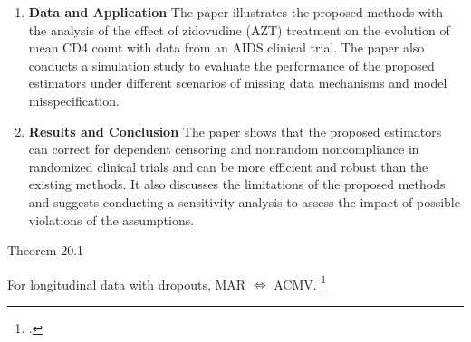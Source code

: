 \documentclass[UTF8,a4paper,10pt]{article}
\begin{document}
\begin{enumerate}
        \begin{itemize}
            \item $R_{it}$ is the response indicator, which equals 1 if the outcome is observed at time $t$ for subject $i$, and 0 otherwise.
            \item $\bar{W}_{it}$ is the vector of observed outcomes and covariates up to time $t$ for subject $i$.
        \end{itemize}
        The paper derives the asymptotic properties of the proposed estimators and compares them with other methods such as the G-computation algorithm, the sweep estimator\footnote{which I do not understand yet.}.
    \item \textbf{Data and Application}
    The paper illustrates the proposed methods with the analysis of the effect of zidovudine (AZT) treatment on the evolution of mean CD4 count with data from an AIDS clinical trial. The paper also conducts a simulation study to evaluate the performance of the proposed estimators under different scenarios of missing data mechanisms and model misspecification.
    \item     \textbf{Results and Conclusion}
    The paper shows that the proposed estimators can correct for dependent censoring and nonrandom noncompliance in randomized clinical trials and can be more efficient and robust than the existing methods. It also discusses the limitations of the proposed methods and suggests conducting a sensitivity analysis to assess the impact of possible violations of the assumptions. 
    
\end{enumerate}








\pagebreak


\begin{Problem}[]{}
    Theorem 20.1
    
    For longitudinal data with dropouts, MAR \(\Longleftrightarrow\)  ACMV.
     \footcite[][334]{Verbeke2001}
\end{Problem}
\end{document}
